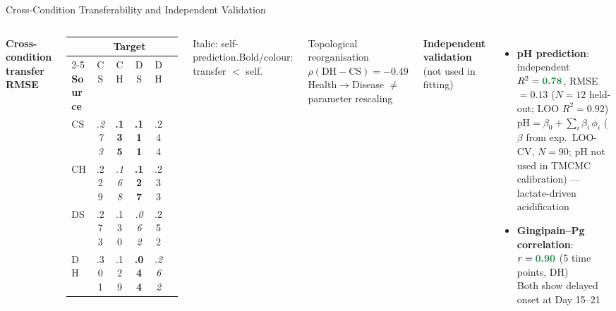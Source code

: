 \documentclass[aspectratio=169,10pt,t]{beamer}
\newcommand{\hl}[1]{\textbf{\textcolor{ikm}{#1}}}
\newcommand{\hlg}[1]{\textbf{\textcolor{green2}{#1}}}
\begin{document}
\begin{frame}[t]{Cross-Condition Transferability and Independent Validation}
  \small\vspace{-2pt}
  \begin{columns}[T]
      \textbf{Cross-condition transfer RMSE}
      \vspace{3pt}
      \renewcommand{\arraystretch}{1.1}
      \begin{tabular}{@{}lccccc@{}}
        \toprule
        & \multicolumn{4}{c}{\textbf{Target}} \\
        \cmidrule{2-5}
        \textbf{Source} & CS & CH & DS & DH \\
        \midrule
        CS & \textit{.273} & \hl{\textbf{.135}} & \hl{\textbf{.111}} & .244 \\
        CH & .229 & \textit{.168} & \hl{\textbf{.127}} & .233 \\
        DS & .273 & .130 & \textit{.062} & .252 \\
        DH & .301 & .129 & \hlg{\textbf{.044}} & \textit{.262} \\
        \bottomrule
      \end{tabular}
      \vspace{2pt}
      {\scriptsize Italic: self-prediction.\quad Bold/colour: transfer $<$ self.}
      \vspace{4pt}
      \begin{alertblock}{Topological reorganisation}
        $\rho(\mathrm{DH}{-}\mathrm{CS})=-0.49$\\
        Health$\to$Disease $\neq$ parameter rescaling
      \end{alertblock}
      \textbf{Independent validation} (not used in fitting)
      \vspace{3pt}
      \begin{itemize}\setlength{\itemsep}{3pt}
        \item[\hlg{$\checkmark$}] \textbf{pH prediction}:
          independent $R^2=\hlg{0.78}$, RMSE\,$=0.13$ ($N=12$ held-out; LOO $R^2=0.92$)\\
          {\scriptsize $\mathrm{pH}=\beta_0+\sum_i\beta_i\,\phi_i$ ($\beta$ from exp.\ LOO-CV, $N=90$;
           pH not used in TMCMC calibration) --- lactate-driven acidification}
        \item[\hlg{$\checkmark$}] \textbf{Gingipain--Pg correlation}:
          $r=\hlg{0.90}$ (5 time points, DH)\\
          {\scriptsize Both show delayed onset at Day 15--21}

\end{itemize}
\end{columns}
\end{frame}
\end{document}
